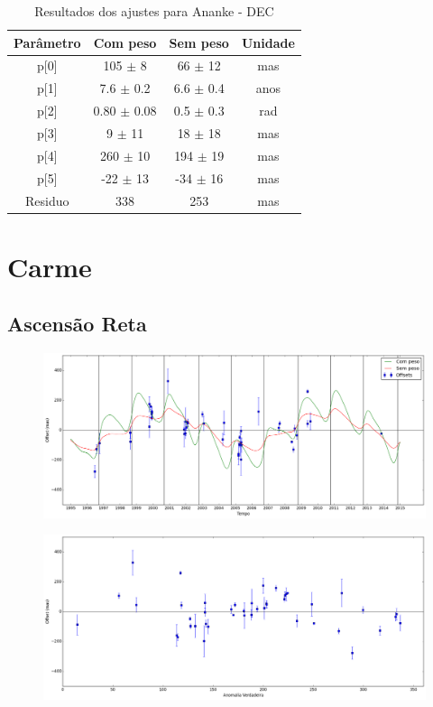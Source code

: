 \documentclass[11pt,a4paper]{report}
\begin{document}
\begin{table}[h!]
\caption{\label{Tab: Ananke-DEC} Resultados dos ajustes para Ananke - DEC}
\begin{centering}
\begin{tabular}{cccc}
\hline
\hline
Parâmetro & Com peso & Sem peso & Unidade\tabularnewline
\hline
p[0] & 105 $\pm$ 8 & 66 $\pm$ 12 & mas\\
p[1] & 7.6 $\pm$ 0.2 & 6.6 $\pm$ 0.4 & anos\\
p[2] & 0.80 $\pm$ 0.08 & 0.5 $\pm$ 0.3 & rad\\
p[3] & 9 $\pm$ 11 & 18 $\pm$ 18 & mas\\
p[4] & 260 $\pm$ 10 & 194 $\pm$ 19 & mas\\
p[5] & -22 $\pm$ 13 & -34 $\pm$ 16 & mas\\
Residuo & 338 & 253 & mas\\
\hline 
\end{tabular} 
\par\end{centering}
\end{table}

\chapter*{Carme}
\section*{Ascensão Reta}

\begin{figure}[h]
\includegraphics[scale=0.35]{Carme/RA.png} 
\end{figure}

\begin{figure}[h]
\includegraphics[scale=0.35]{Carme/RA_anom.png}  
\end{figure}
\end{document}
